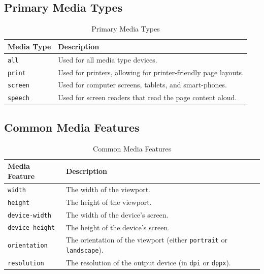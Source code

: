 \documentclass{scrbook}
\begin{document}
\subsection{Primary Media Types}

\begin{table}[htbp]
    \centering
    \begin{tabular}{|l|l|}
    \hline
    \textbf{Media Type} & \textbf{Description} \\
    \hline
    \texttt{all} & Used for all media type devices. \\
    \hline
    \texttt{print} & Used for printers, allowing for printer-friendly page layouts. \\
    \hline
    \texttt{screen} & Used for computer screens, tablets, and smart-phones. \\
    \hline
    \texttt{speech} & Used for screen readers that read the page content aloud. \\
    \hline
    \end{tabular}
    \caption{Primary Media Types}
\end{table}

\subsection{Common Media Features}

\begin{table}[htbp]
    \centering
    \begin{tabular}{|l|l|}
    \hline
    \textbf{Media Feature} & \textbf{Description} \\
    \hline
    \texttt{width} & The width of the viewport. \\
    \hline
    \texttt{height} & The height of the viewport. \\
    \hline
    \texttt{device-width} & The width of the device's screen. \\
    \hline
    \texttt{device-height} & The height of the device's screen. \\
    \hline
    \texttt{orientation} & The orientation of the viewport (either \texttt{portrait} or \texttt{landscape}). \\
    \hline
    \texttt{resolution} & The resolution of the output device (in \texttt{dpi} or \texttt{dppx}). \\
    \hline
    \end{tabular}
    \caption{Common Media Features}
\end{table}
\end{document}

